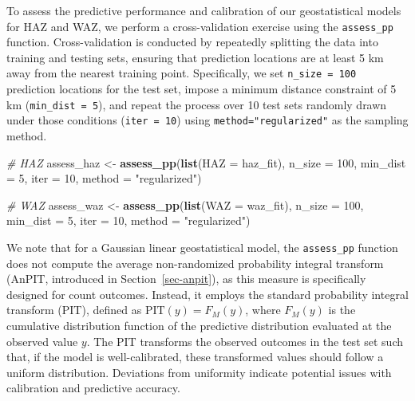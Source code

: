 \documentclass[
  letterpaper,
]{krantz}
\newenvironment{Shaded}{\begin{snugshade}}{\end{snugshade}}
\newcommand{\AttributeTok}[1]{\textcolor[rgb]{0.13,0.29,0.53}{#1}}
\newcommand{\CommentTok}[1]{\textcolor[rgb]{0.56,0.35,0.01}{\textit{#1}}}
\newcommand{\DecValTok}[1]{\textcolor[rgb]{0.00,0.00,0.81}{#1}}
\newcommand{\FunctionTok}[1]{\textcolor[rgb]{0.13,0.29,0.53}{\textbf{#1}}}
\newcommand{\NormalTok}[1]{#1}
\newcommand{\OtherTok}[1]{\textcolor[rgb]{0.56,0.35,0.01}{#1}}
\newcommand{\StringTok}[1]{\textcolor[rgb]{0.31,0.60,0.02}{#1}}
\begin{document}
To assess the predictive performance and calibration of our
geostatistical models for HAZ and WAZ, we perform a cross-validation
exercise using the \texttt{assess\_pp} function. Cross-validation is
conducted by repeatedly splitting the data into training and testing
sets, ensuring that prediction locations are at least 5 km away from the
nearest training point. Specifically, we set \texttt{n\_size\ =\ 100}
prediction locations for the test set, impose a minimum distance
constraint of 5 km (\texttt{min\_dist\ =\ 5}), and repeat the process
over 10 test sets randomly drawn under those conditions
(\texttt{iter\ =\ 10}) using \texttt{method="regularized"} as the
sampling method.

\begin{Shaded}
\begin{Highlighting}[]
\CommentTok{\# HAZ}
\NormalTok{assess\_haz }\OtherTok{\textless{}{-}}
\FunctionTok{assess\_pp}\NormalTok{(}\FunctionTok{list}\NormalTok{(}\AttributeTok{HAZ =}\NormalTok{ haz\_fit),}
          \AttributeTok{n\_size =} \DecValTok{100}\NormalTok{,}
          \AttributeTok{min\_dist =} \DecValTok{5}\NormalTok{,}
          \AttributeTok{iter =} \DecValTok{10}\NormalTok{,}
          \AttributeTok{method =} \StringTok{"regularized"}\NormalTok{)}

\CommentTok{\# WAZ}
\NormalTok{assess\_waz }\OtherTok{\textless{}{-}}
  \FunctionTok{assess\_pp}\NormalTok{(}\FunctionTok{list}\NormalTok{(}\AttributeTok{WAZ =}\NormalTok{ waz\_fit),}
            \AttributeTok{n\_size =} \DecValTok{100}\NormalTok{,}
            \AttributeTok{min\_dist =} \DecValTok{5}\NormalTok{,}
            \AttributeTok{iter =} \DecValTok{10}\NormalTok{,}
            \AttributeTok{method =} \StringTok{"regularized"}\NormalTok{)}
\end{Highlighting}
\end{Shaded}

We note that for a Gaussian linear geostatistical model, the
\texttt{assess\_pp} function does not compute the average non-randomized
probability integral transform (AnPIT, introduced in
Section~\ref{sec-anpit}), as this measure is specifically designed for
count outcomes. Instead, it employs the standard probability integral
transform (PIT), defined as \(\text{PIT}(y) = F_{M}(y)\), where
\(F_{M}(y)\) is the cumulative distribution function of the predictive
distribution evaluated at the observed value \(y\). The PIT transforms
the observed outcomes in the test set such that, if the model is
well-calibrated, these transformed values should follow a uniform
distribution. Deviations from uniformity indicate potential issues with
calibration and predictive accuracy.
\end{document}
